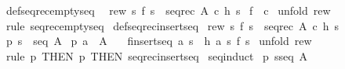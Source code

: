 \begin{isabellebody}
\ def{\isacharunderscore}seq{\isacharunderscore}rec{\isacharunderscore}emptyseq{\isacharcolon}\ \isanewline
{}\ rew{\isacharcolon}\ {\isachardoublequoteopen}{\isacharbang}{\isacharbang}s{\isachardot}\ f\ s\ {\isacharequal}{\isacharequal}\ seq{\isacharunderscore}rec\ A\ c\ h\ s{\isachardoublequoteclose}\isanewline
{}\ {\isachardoublequoteopen}f{\isacharparenleft}{\isacharpercent}{\isacharless}{\isacharpercent}{\isachargreater}{\isacharparenright}\ {\isacharequal}\ c{\isachardoublequoteclose}\isanewline
%
\isadelimproof
%
\endisadelimproof
%
\isatagproof
{}\isamarkupfalse%
\ {\isacharparenleft}unfold\ rew{\isacharparenright}\isanewline
{}\isamarkupfalse%
\ {\isacharparenleft}rule\ seq{\isacharunderscore}rec{\isacharunderscore}emptyseq{\isacharparenright}\isanewline
{}\isamarkupfalse%
%
\endisatagproof
{\isafoldproof}%
%
\isadelimproof
\isanewline
%
\endisadelimproof
\isanewline
{}\isamarkupfalse%
\ def{\isacharunderscore}seq{\isacharunderscore}rec{\isacharunderscore}insertseq{\isacharcolon}\isanewline
{}\ rew{\isacharcolon}\ {\isachardoublequoteopen}{\isacharbang}{\isacharbang}s{\isachardot}\ f\ s\ {\isacharequal}{\isacharequal}\ seq{\isacharunderscore}rec\ A\ c\ h\ s{\isachardoublequoteclose}\isanewline
{}\ p{}{\isacharcolon}\ {\isachardoublequoteopen}s\ {\isacharcolon}\ seq\ A{\isachardoublequoteclose}\isanewline
{}\ p{}{\isacharcolon}\ {\isachardoublequoteopen}a\ {\isacharcolon}\ A{\isachardoublequoteclose}\ \ \isanewline
{}\ {\isachardoublequoteopen}f{\isacharparenleft}insertseq\ a\ s{\isacharparenright}\ {\isacharequal}\ h\ a\ s\ {\isacharparenleft}f\ s{\isacharparenright}{\isachardoublequoteclose}\isanewline
%
\isadelimproof
%
\endisadelimproof
%
\isatagproof
{}\isamarkupfalse%
\ {\isacharparenleft}unfold\ rew{\isacharparenright}\isanewline
{}\isamarkupfalse%
\ {\isacharparenleft}rule\ p{}\ {\isacharbrackleft}THEN\ p{}\ {\isacharbrackleft}THEN\ seq{\isacharunderscore}rec{\isacharunderscore}insertseq{\isacharbrackright}{\isacharbrackright}{\isacharparenright}\isanewline
{}\isamarkupfalse%
%
\endisatagproof
{\isafoldproof}%
%
\isadelimproof
\isanewline
%
\endisadelimproof
\isanewline
{}\isamarkupfalse%
\ seq{\isacharunderscore}induct{\isacharcolon}\isanewline
{}\ p{}{\isacharcolon}\ {\isachardoublequoteopen}s{\isacharcolon}seq\ A{\isachardoublequoteclose}\isanewline

\end{isabellebody}
